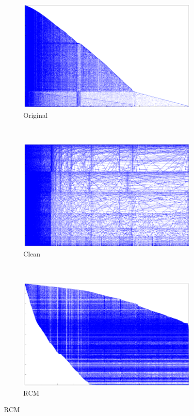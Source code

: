 \documentclass[]{exam}
\begin{document}
\begin{questions}
    \begin{figure}[h!]
      \centering
      \begin{subfigure}[b]{0.3\textwidth}
        \includegraphics[width=\textwidth]{orig}
        \caption{Original}
      \end{subfigure}
      ~
      \begin{subfigure}[b]{0.3\textwidth}
        \includegraphics[width=\textwidth]{clean}
        \caption{Clean}
      \end{subfigure}
      ~
      \begin{subfigure}[b]{0.3\textwidth}
        \includegraphics[width=\textwidth]{rcm}
        \caption{RCM}
      \end{subfigure}
    \end{figure}


\end{questions}
\end{document}
